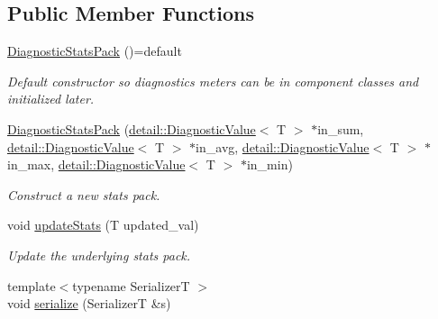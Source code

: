 \subsection*{Public Member Functions}
\begin{DoxyCompactItemize}
\item 
\hyperlink{structvt_1_1runtime_1_1component_1_1meter_1_1_diagnostic_stats_pack_a1ff8f169f544a2c1966e9336043f97cb}{Diagnostic\+Stats\+Pack} ()=default
\begin{DoxyCompactList}\small\item\em Default constructor so diagnostics meters can be in component classes and initialized later. \end{DoxyCompactList}\item 
\hyperlink{structvt_1_1runtime_1_1component_1_1meter_1_1_diagnostic_stats_pack_a849682d9001fa90617a6a505b0cf3f17}{Diagnostic\+Stats\+Pack} (\hyperlink{structvt_1_1runtime_1_1component_1_1detail_1_1_diagnostic_value}{detail\+::\+Diagnostic\+Value}$<$ T $>$ $\ast$in\+\_\+sum, \hyperlink{structvt_1_1runtime_1_1component_1_1detail_1_1_diagnostic_value}{detail\+::\+Diagnostic\+Value}$<$ T $>$ $\ast$in\+\_\+avg, \hyperlink{structvt_1_1runtime_1_1component_1_1detail_1_1_diagnostic_value}{detail\+::\+Diagnostic\+Value}$<$ T $>$ $\ast$in\+\_\+max, \hyperlink{structvt_1_1runtime_1_1component_1_1detail_1_1_diagnostic_value}{detail\+::\+Diagnostic\+Value}$<$ T $>$ $\ast$in\+\_\+min)
\begin{DoxyCompactList}\small\item\em Construct a new stats pack. \end{DoxyCompactList}\item 
void \hyperlink{structvt_1_1runtime_1_1component_1_1meter_1_1_diagnostic_stats_pack_a76c69a042e32f540707de15227fd77d8}{update\+Stats} (T updated\+\_\+val)
\begin{DoxyCompactList}\small\item\em Update the underlying stats pack. \end{DoxyCompactList}\item 
{\footnotesize template$<$typename SerializerT $>$ }\\void \hyperlink{structvt_1_1runtime_1_1component_1_1meter_1_1_diagnostic_stats_pack_a4c0cc8249fe780c2bf36485d1f87cf95}{serialize} (SerializerT \&s)
\end{DoxyCompactItemize}
